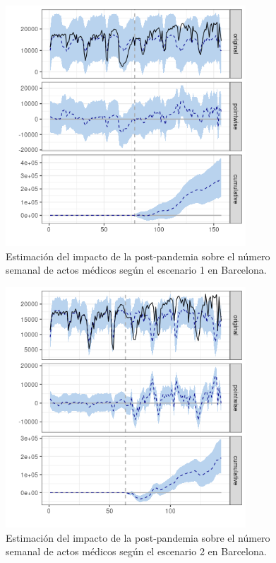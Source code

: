 \documentclass[12pt,twoside]{article} %
\begin{document}
  \begin{center}
  \begin{figure}[H]
  \includegraphics[width=9cm]{global_post_scen1_Barcelona.png}\caption{Estimación del impacto de la post-pandemia sobre el número semanal de actos médicos según el escenario 1 en Barcelona.}
  \end{figure}
  \end{center}
  
  \begin{center}
    \begin{figure}[H]
      \includegraphics[width=9cm]{global_post_scen2_Barcelona.png}\caption{Estimación del impacto de la post-pandemia sobre el número semanal de actos médicos según el escenario 2 en Barcelona.}
    \end{figure}
    \end{center}
\end{document}
